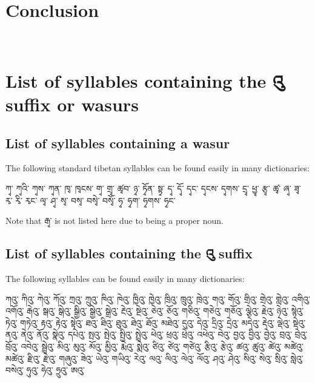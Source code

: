 \documentclass[%
a4paper,%
pagesize,%
12pt,%
parskip=off,%
bibliography=totoc,%
numbers=noenddot,%
DIV=12,%
twoside=semi,%
headings=normal%
]{scrartcl}
\begin{document}
\section{Conclusion}

­\appendix

\section{List of syllables containing the འུ suffix or wasurs}

\subsection{List of syllables containing a wasur}

The following standard tibetan syllables can be found easily in many dictionaries:

ཀྭ་ ཀྭའི་ ཀྭས་ ཀྭན་ ཁྭ་ ཁྭངས་ གྭ་ གྲྭ་ ཚྭབ་ ཉྭ་ ཏྭོན་ སྟྭ་ དྭ་ དྭོ་ དྭང་ དྭངས་ དྭགས་ དྲྭ་ ཕྱྭ་ རྩྭ་ ཚྭ་ ཞྭ་ ཟྭ་ རྭ་ རྭི་ རྭང་ ལྭ་ ཤྭ་ སྭ་ བསྭ་ བསྭེ་ བསྭོ་ ཧྭ་ ཧྭག་ ཧྭགས་ ཧྭང་ 

Note that རྒྭ་ is not listed here due to being a proper noun.

\subsection{List of syllables containing the འུ suffix}

The following syllables can be found easily in many dictionaries:

ཀའུ་ ཀིའུ་ ཀེའུ་ ཀོའུ་ ཀྲའུ་ ཀྲུའུ་ ཁིའུ་ ཁེའུ་ ཁྱིའུ་ ཁྱེའུ་ ཁྲིའུ་ ཁྲུའུ་ ཁྲེའུ་ གའུ་ གོའུ་ གྲིའུ་ གྲེའུ་ གླེའུ་ འགིའུ་ འགོའུ་ རྒེའུ་ སྒའུ་ སྒེའུ་ སྒྱིའུ་ སྒྱེའུ་ སྒྲེའུ་ རྔེའུ་ སྔེའུ་ ཅེའུ་ ཅོའུ་ གཅིའུ་ གཅེའུ་ གཅོའུ་ ལྕེའུ་ རྗེའུ་ ཉེའུ་ སྙེའུ་ ཏེའུ་ གཏེའུ་ རྟའུ་ རྟེའུ་ སྟེའུ་ ཐའུ་ ཐིའུ་ ཐུའུ་ ཐེའུ་ ཐོའུ་ མཐེའུ་ དུའུ་ དེའུ་ དྲིའུ་ དྲེའུ་ མདེའུ་ རྡེའུ་ ལྡེའུ་ སྡེའུ་ ནའུ་ ནེའུ་ ནོའུ་ སྣེའུ་ དཔེའུ་ སྤའུ་ སྤེའུ་ སྤྱིའུ་ སྤྲེའུ་ ཕེའུ་ ཕྲའུ་ ཕྲེའུ་ འཕེའུ་ བེའུ་ བྱའུ་ བྱིའུ་ བྱེའུ་ བྲའུ་ བྲེའུ་ བྲོའུ་ འབེའུ་ སྦྲེའུ་ མིའུ་ མུའུ་ མོའུ་ མྱིའུ་ རྨེའུ་ སྨེའུ་ ཙིའུ་ ཙེའུ་ གཙེའུ་ རྩིའུ་ རྩེའུ་ ཚའུ་ ཚུའུ་ ཚེའུ་ མཚེའུ་ མཚེའུ་ རྫིའུ་ རྫེའུ་ གཞུའུ་ ཟེའུ་ ཡེའུ་ གཡིའུ་ རེའུ་ ལའུ་ ལིའུ་ ལེའུ་ ལོའུ་ ཤའུ་ ཤེའུ་ སིའུ་ སེའུ་ སྲིའུ་ སླེའུ་ བསེའུ་ ཧུའུ་ ཧེའུ་ ཧྲུའུ་ ཨའུ་



\end{document}

